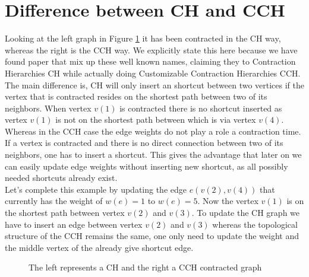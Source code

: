 \section{Difference between CH and CCH}

Looking at the left graph in Figure \ref*{fig:DifferenceCHAndCCH} it has been contracted in the CH way, whereas the right is the CCH way. We explicitly state this here because 
we have found paper \cite{Ouyang_2020} that mix up these well known names, claiming they to Contraction Hierarchies CH while actually doing Customizable Contraction Hierarchies CCH. 
The main difference is, CH will only insert an shortcut between two vertices if the vertex that is contracted resides on the shortest path between two of its neighbors. 
When vertex $v(1)$ is contracted there is no shortcut inserted as vertex $v(1)$ is not on the shortest path between which is via vertex $v(4)$.
\\
Whereas in the CCH case the edge weights do not play a role a contraction time. If a vertex is contracted and there is no direct connection between two of its neighbors, one has to insert a shortcut. This gives
the advantage that later on we can easily update edge weights without inserting new shortcut, as all possibly needed shortcuts already exist.
\\ 
Let's complete this example by updating the edge $e(v(2), v(4))$ that currently has the weight of $w(e)=1$ to $w(e) = 5$. Now the vertex $v(1)$ is on the shortest path between vertex $v(2)$ and $v(3)$. 
To update the CH graph we have to insert an edge between vertex $v(2)$ and $v(3)$ whereas the topological structure of the CCH remains the same, one only need to update the weight and the middle vertex of the already give shortcut edge.

\begin{figure}
    \centering
    
    \caption{The left represents a CH and the right a CCH contracted graph}
    \label{fig:DifferenceCHAndCCH}
\end{figure}

